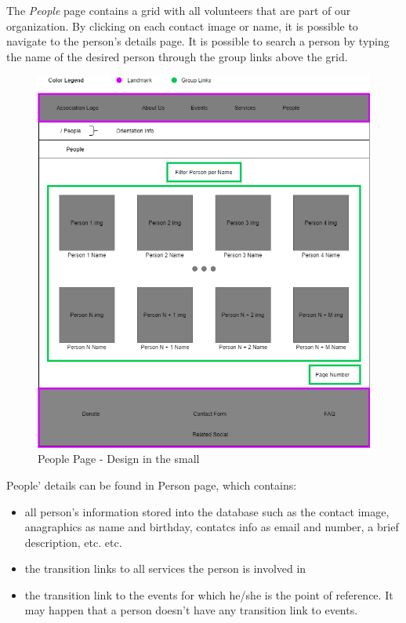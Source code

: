 The \emph{People} page contains a grid with all volunteers that are part of our organization.  By clicking on each contact image or name, it is possible to navigate to the person's details page. It is possible to search a person by typing the name of the desired person  through the group links above the grid. 

\begin{figure}[h!]
		\centering
		\begin{minipage}[b]{1\textwidth}
    			\includegraphics[width=\textwidth]{./assets/people.png}
			\caption{People Page - Design in the small}
		\end{minipage}
	\end{figure}
	\FloatBarrier
\vspace{1cm}
\hspace{-1cm}
People' details can be found in Person page, which contains:
\begin{itemize}
	\item all person's information stored into the database such as the contact image, anagraphics as name and birthday, contatcs 			info as email and number,	a brief description, etc. etc.
	\item the transition links to all services the person is involved in
	\item the transition link to the events for which he/she is the point of reference. It may happen that a person doesn't have any 		transition link to events.
\end{itemize} 

